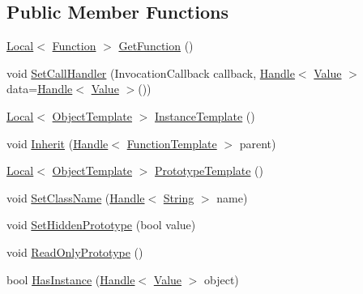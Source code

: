 \subsection*{Public Member Functions}
\begin{DoxyCompactItemize}
\item 
\hyperlink{classv8_1_1_local}{Local}$<$ \hyperlink{classv8_1_1_function}{Function} $>$ \hyperlink{classv8_1_1_function_template_a3b8e5e214b2ee34c36138961ebac696a}{Get\+Function} ()
\item 
void \hyperlink{classv8_1_1_function_template_a9eb1c827b17faf398a81068721bf40ab}{Set\+Call\+Handler} (Invocation\+Callback callback, \hyperlink{classv8_1_1_handle}{Handle}$<$ \hyperlink{classv8_1_1_value}{Value} $>$ data=\hyperlink{classv8_1_1_handle}{Handle}$<$ \hyperlink{classv8_1_1_value}{Value} $>$())
\item 
\hyperlink{classv8_1_1_local}{Local}$<$ \hyperlink{classv8_1_1_object_template}{Object\+Template} $>$ \hyperlink{classv8_1_1_function_template_a00dd9725566908e8fd14064542f5a781}{Instance\+Template} ()
\item 
void \hyperlink{classv8_1_1_function_template_a18f343e7e5749ed886d6e76a1424216e}{Inherit} (\hyperlink{classv8_1_1_handle}{Handle}$<$ \hyperlink{classv8_1_1_function_template}{Function\+Template} $>$ parent)
\item 
\hyperlink{classv8_1_1_local}{Local}$<$ \hyperlink{classv8_1_1_object_template}{Object\+Template} $>$ \hyperlink{classv8_1_1_function_template_aa2bcc2652b5f0fdbc666d943ccf72021}{Prototype\+Template} ()
\item 
void \hyperlink{classv8_1_1_function_template_a10ad6f0d3d1f67823e08fbca7c5dde41}{Set\+Class\+Name} (\hyperlink{classv8_1_1_handle}{Handle}$<$ \hyperlink{classv8_1_1_string}{String} $>$ name)
\item 
void \hyperlink{classv8_1_1_function_template_ade426e8a21d777ae6100e6c1aa7bfaee}{Set\+Hidden\+Prototype} (bool value)
\item 
void \hyperlink{classv8_1_1_function_template_a91d2e0643e8c5a53ab1d75f7766c2422}{Read\+Only\+Prototype} ()
\item 
bool \hyperlink{classv8_1_1_function_template_aa883e4ab6643498662f7873506098c98}{Has\+Instance} (\hyperlink{classv8_1_1_handle}{Handle}$<$ \hyperlink{classv8_1_1_value}{Value} $>$ object)
\end{DoxyCompactItemize}
